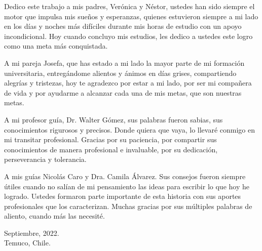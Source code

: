 


Dedico este trabajo a mis padres, Verónica y Néstor, ustedes han sido siempre el motor que impulsa mis sueños y esperanzas, 
quienes estuvieron siempre a mi lado en los días y noches más difíciles durante mis horas de estudio con un apoyo incondicional. 
Hoy cuando concluyo mis estudios, les dedico a ustedes este logro como una meta más conquistada. 

A mi pareja Josefa, que has estado a mi lado la mayor parte de mi formación universitaria, entregándome alientos y ánimos en días grises, compartiendo alegrías y tristezas,
hoy te agradezco por estar a mi lado, por ser mi compañera de vida y por ayudarme a alcanzar cada una de mis metas, que son nuestras metas.

A mi profesor guía, Dr. Walter Gómez, sus palabras fueron sabias, sus conocimientos rigurosos y precisos. Donde quiera que vaya, 
lo llevaré conmigo en mi transitar profesional. Gracias por su paciencia, por compartir sus conocimientos de manera profesional e invaluable, por su dedicación, perseverancia y tolerancia.

A mis guías Nicolás Caro y Dra. Camila Álvarez. Sus consejos fueron siempre 
útiles cuando no salían de mi pensamiento las ideas para escribir lo que hoy he logrado. Ustedes formaron parte importante de esta historia con sus aportes profesionales que 
los caracterizan. Muchas gracias por sus múltiples palabras de aliento, cuando más las necesité. 

\vfill
\singlespacing
\begin{flushright}
	\noindent
    Septiembre, 2022. \\
	Temuco, Chile. 
\end{flushright}
    
